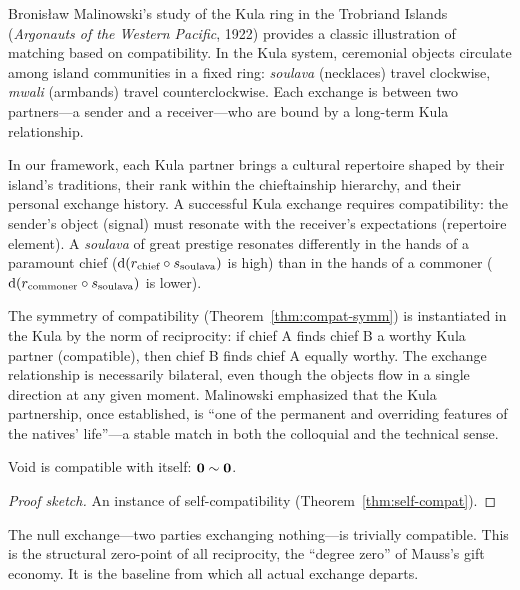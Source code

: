 \begin{example}
Bronisław Malinowski's study of the Kula ring in the Trobriand Islands
(\textit{Argonauts of the Western Pacific}, 1922) provides a classic
illustration of matching based on compatibility.  In the Kula system,
ceremonial objects circulate among island communities in a fixed ring:
\emph{soulava} (necklaces) travel clockwise, \emph{mwali} (armbands)
travel counterclockwise.  Each exchange is between two partners---a
sender and a receiver---who are bound by a long-term Kula relationship.

In our framework, each Kula partner brings a cultural repertoire shaped
by their island's traditions, their rank within the chieftainship
hierarchy, and their personal exchange history.  A successful Kula
exchange requires compatibility: the sender's object (signal) must
resonate with the receiver's expectations (repertoire element).  A
\emph{soulava} of great prestige resonates differently in the hands of a
paramount chief ($\operatorname{d}(r_{\text{chief}} \circ s_{\text{soulava}})$
is high) than in the hands of a commoner
($\operatorname{d}(r_{\text{commoner}} \circ s_{\text{soulava}})$ is lower).

The symmetry of compatibility (Theorem~\ref{thm:compat-symm}) is
instantiated in the Kula by the norm of reciprocity: if chief A finds
chief B a worthy Kula partner (compatible), then chief B finds chief A
equally worthy.  The exchange relationship is necessarily bilateral, even
though the objects flow in a single direction at any given moment.
Malinowski emphasized that the Kula partnership, once established, is
``one of the permanent and overriding features of the natives'
life''---a stable match in both the colloquial and the technical sense.
\end{example}

\begin{theorem}
\label{thm:void-self-compat}
Void is compatible with itself: $\mathbf{0} \sim \mathbf{0}$.
\end{theorem}

\begin{proof}[Proof sketch]
An instance of self-compatibility (Theorem~\ref{thm:self-compat}).
\end{proof}

The null exchange---two parties exchanging nothing---is trivially compatible.
This is the structural zero-point of all reciprocity, the ``degree zero'' of
Mauss's gift economy.  It is the baseline from which all actual exchange
departs.

